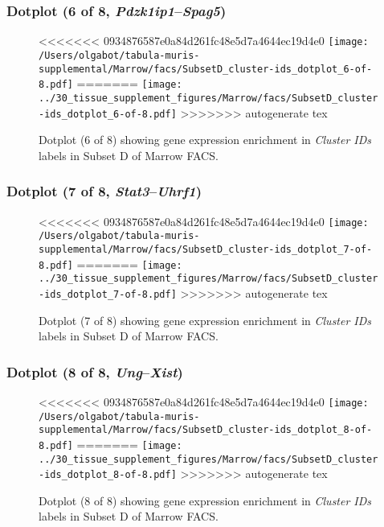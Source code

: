 \clearpage

\subsubsection{Dotplot (6 of 8, \emph{Pdzk1ip1}--\emph{Spag5})}
\begin{figure}[h]
\centering
<<<<<<< 0934876587e0a84d261fc48e5d7a4644ec19d4e0
\texttt{[image: /Users/olgabot/tabula-muris-supplemental/Marrow/facs/SubsetD\_cluster-ids\_dotplot\_6-of-8.pdf]}
=======
\texttt{[image: ../30\_tissue\_supplement\_figures/Marrow/facs/SubsetD\_cluster-ids\_dotplot\_6-of-8.pdf]}
>>>>>>> autogenerate tex

\caption{ Dotplot (6 of 8)  showing gene expression enrichment in \emph{Cluster IDs} labels in Subset D of Marrow FACS. }
\end{figure}


\clearpage

\subsubsection{Dotplot (7 of 8, \emph{Stat3}--\emph{Uhrf1})}
\begin{figure}[h]
\centering
<<<<<<< 0934876587e0a84d261fc48e5d7a4644ec19d4e0
\texttt{[image: /Users/olgabot/tabula-muris-supplemental/Marrow/facs/SubsetD\_cluster-ids\_dotplot\_7-of-8.pdf]}
=======
\texttt{[image: ../30\_tissue\_supplement\_figures/Marrow/facs/SubsetD\_cluster-ids\_dotplot\_7-of-8.pdf]}
>>>>>>> autogenerate tex

\caption{ Dotplot (7 of 8)  showing gene expression enrichment in \emph{Cluster IDs} labels in Subset D of Marrow FACS. }
\end{figure}


\clearpage

\subsubsection{Dotplot (8 of 8, \emph{Ung}--\emph{Xist})}
\begin{figure}[h]
\centering
<<<<<<< 0934876587e0a84d261fc48e5d7a4644ec19d4e0
\texttt{[image: /Users/olgabot/tabula-muris-supplemental/Marrow/facs/SubsetD\_cluster-ids\_dotplot\_8-of-8.pdf]}
=======
\texttt{[image: ../30\_tissue\_supplement\_figures/Marrow/facs/SubsetD\_cluster-ids\_dotplot\_8-of-8.pdf]}
>>>>>>> autogenerate tex

\caption{ Dotplot (8 of 8)  showing gene expression enrichment in \emph{Cluster IDs} labels in Subset D of Marrow FACS. }
\end{figure}


